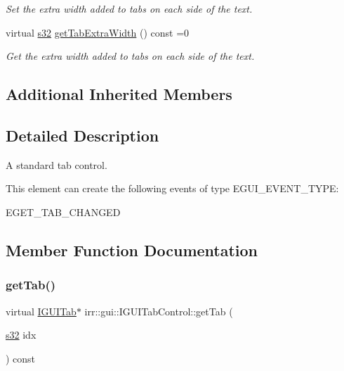 \begin{DoxyCompactItemize}
\begin{DoxyCompactList}\small\item\em Set the extra width added to tabs on each side of the text. \end{DoxyCompactList}\item 
virtual \hyperlink{namespaceirr_ac66849b7a6ed16e30ebede579f9b47c6}{s32} \hyperlink{classirr_1_1gui_1_1IGUITabControl_afaeab7a998a34ab5e8398930276ab3bd}{get\+Tab\+Extra\+Width} () const =0
\begin{DoxyCompactList}\small\item\em Get the extra width added to tabs on each side of the text. \end{DoxyCompactList}\end{DoxyCompactItemize}
\subsection*{Additional Inherited Members}


\subsection{Detailed Description}
A standard tab control. 

\begin{DoxyParagraph}{This element can create the following events of type E\+G\+U\+I\+\_\+\+E\+V\+E\+N\+T\+\_\+\+T\+Y\+PE\+:}
\begin{DoxyItemize}
\item E\+G\+E\+T\+\_\+\+T\+A\+B\+\_\+\+C\+H\+A\+N\+G\+ED \end{DoxyItemize}

\end{DoxyParagraph}


\subsection{Member Function Documentation}
\mbox{\label{classirr_1_1gui_1_1IGUITabControl_a1ce91106037c880aae15df77f42aeeda}} 
\subsubsection{\texorpdfstring{get\+Tab()}{getTab()}\hspace{0.1cm}{\footnotesize\ttfamily [1/2]}}
{\footnotesize\ttfamily virtual \hyperlink{classirr_1_1gui_1_1IGUITab}{I\+G\+U\+I\+Tab}$\ast$ irr\+::gui\+::\+I\+G\+U\+I\+Tab\+Control\+::get\+Tab (\begin{DoxyParamCaption}\item[{\hyperlink{namespaceirr_ac66849b7a6ed16e30ebede579f9b47c6}{s32}}]{idx }\end{DoxyParamCaption}) const\hspace{0.3cm}{\ttfamily [pure virtual]}}



